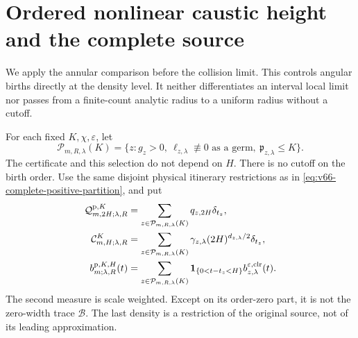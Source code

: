 \section{Ordered nonlinear caustic height and the complete source}
\label{sec:v68-annular-height}
We apply the annular comparison before the collision limit. This
controls angular births directly at the density level. It neither
differentiates an interval local limit nor passes from a finite-count
analytic radius to a uniform radius without a cutoff.

For each fixed $K,\chi,\varepsilon$, let
\begin{equation}\label{eq:v68-persistence-stratum}
 \mathcal P_{m,R,\lambda}(K)=
 \{z:g_z>0,\ \ell_{z,\lambda}\not\equiv0\text{ as a germ},\
                                  \mathfrak p_{z,\lambda}\le K\}.
\end{equation}
The certificate and this selection do not depend on $H$. There is
no cutoff on the birth order. Use the same disjoint physical itinerary
restrictions as in \eqref{eq:v66-complete-positive-partition}, and put
\begin{align}
 \mathcal Q^{\mathrm p,K}_{m,2H;\lambda,R}
       &=\sum_{z\in\mathcal P_{m,R,\lambda}(K)}q_{z,2H}\delta_{t_z},
                                                   \notag\\
 \mathcal C^K_{m,H;\lambda,R}
       &=\sum_{z\in\mathcal P_{m,R,\lambda}(K)}
            \gamma_{z,\lambda}(2H)^{d_{z,\lambda}/2}\delta_{t_z},
                                               \label{eq:v68-scale-trace}\\
 b^{\mathrm p,K,H}_{m;\lambda,R}(t)
       &=\sum_{z\in\mathcal P_{m,R,\lambda}(K)}
          \one_{\{0<t-t_z<H\}}
                       b_{z,\lambda}^{\varepsilon,\mathrm{clr}}(t).
                                               \label{eq:v68-physical-collar}
\end{align}
The second measure is scale weighted. Except on its order-zero part,
it is not the zero-width trace $\mathcal B$. The last density is a
restriction of the original source, not of its leading approximation.

